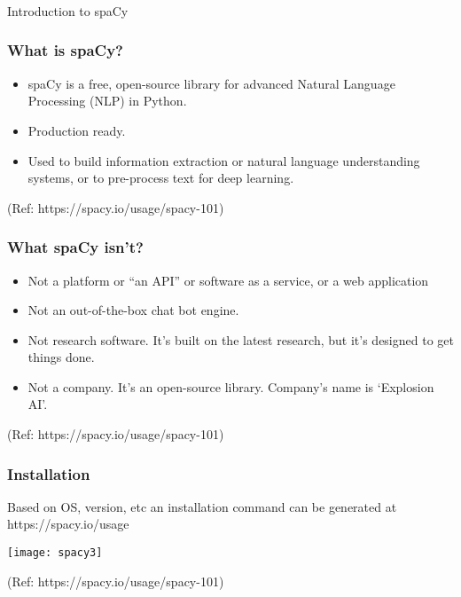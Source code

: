 \begin{frame}[fragile]\frametitle{}

\begin{center}
{\Large Introduction to spaCy}
\end{center}
\end{frame}
%

\begin{frame}[fragile]\frametitle{What is spaCy?}
  \begin{itemize}
    \item spaCy is a free, open-source library for advanced Natural Language Processing (NLP) in Python.
		\item Production ready.
		\item Used to build information extraction or natural language understanding systems, or to pre-process text for deep learning.
  \end{itemize}
	
{\tiny (Ref: https://spacy.io/usage/spacy-101)}
\end{frame}



\begin{frame}[fragile]\frametitle{What spaCy isn't?}
  \begin{itemize}
    \item Not a platform or “an API” or software as a service, or a web application
		\item Not an out-of-the-box chat bot engine.
		\item Not research software.  It’s built on the latest research, but it’s designed to get things done.
		\item Not a company. It’s an open-source library. Company's name is `Explosion AI'.
  \end{itemize}
	
{\tiny (Ref: https://spacy.io/usage/spacy-101)}
\end{frame}

\begin{frame}[fragile]\frametitle{Installation}
Based on OS, version, etc an installation command can be generated at https://spacy.io/usage

	
\begin{center}
\texttt{[image: spacy3]}
\end{center}

{\tiny (Ref: https://spacy.io/usage/spacy-101)}
\end{frame}

